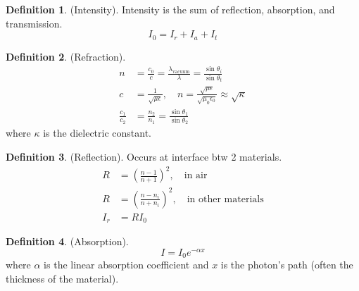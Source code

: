\documentclass{article}
\theoremstyle{definition}
\newtheorem{definition}{Definition}[section]
\begin{document}
\begin{definition}
    (Intensity). Intensity is the sum of reflection, absorption, and transmission.
    \begin{equation}
        I_0 = I_r + I_a + I_t
    \end{equation}
\end{definition}

\begin{definition}
    (Refraction).
    \begin{align}
        n &= \frac{c_0}{c} = \frac{\lambda_{\text{vacuum}}}{\lambda} = \frac{\sin \theta_i}{\sin \theta_t} \\
        c &= \frac{1}{\sqrt{\mu \epsilon}}, \quad n = \frac{\sqrt{\mu \epsilon}}{\sqrt{\mu_0 \epsilon_0}} \approx \sqrt{\kappa} \\
        \frac{c_1}{c_2} &= \frac{n_2}{n_1} = \frac{\sin \theta_1}{\sin \theta_2}
    \end{align}
    where $\kappa$ is the dielectric constant.
\end{definition}

\begin{definition}
    (Reflection). Occurs at interface btw 2 materials.
    \begin{align}
        R &= \left( \frac{n-1}{n+1} \right)^2, \quad \text{in air} \\
        R &= \left( \frac{n-n_i}{n+n_i} \right)^2, \quad \text{in other materials} \\
        I_r &= RI_0
    \end{align}
\end{definition}

\begin{definition}
    (Absorption).
    \begin{equation}
        I = I_0 e^{-\alpha x}
    \end{equation}
    where $\alpha$ is the linear absorption coefficient and $x$ is the photon's path (often the thickness of the material).
\end{definition}
\end{document}
